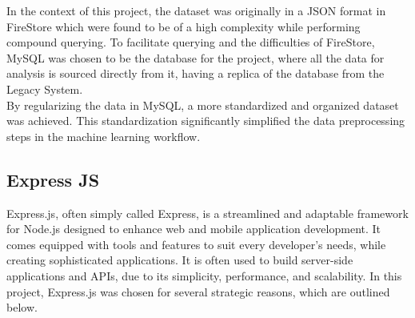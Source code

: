 In the context of this project, the dataset was originally in a JSON format in FireStore which were found to be of a high complexity while performing compound querying. To facilitate querying and the 
difficulties of FireStore, MySQL was chosen to be the database for the project, where all the data for analysis is sourced directly from it, having a replica of the database
from the Legacy System. \\
By regularizing the data in MySQL, a more standardized and organized dataset was achieved. This standardization significantly simplified the data preprocessing steps in the machine learning workflow.


\subsection{Express JS}
Express.js, often simply called Express, is a streamlined and adaptable framework for Node.js designed to enhance web and mobile application development. It comes equipped 
with tools and features to suit every developer's needs, while creating sophisticated applications.
It is often used to build server-side applications and APIs, due to its simplicity, performance, and scalability. In this project, Express.js was chosen for several strategic reasons, which are outlined below.\cite{express}

